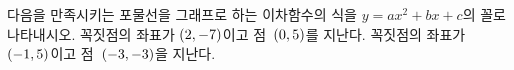 다음을 만족시키는 포물선을 그래프로 하는 이차함수의 식을 $y=ax^2+bx+c$의 꼴로 나타내시오.
 꼭짓점의 좌표가 $(2{,}\mkern3mu\mathopen{}-7)$이고 점~$(0{,}\mkern3mu\mathopen{}5)$를 지난다.
 꼭짓점의 좌표가 $(-1{,}\mkern3mu\mathopen{}5)$이고 점~$(-3{,}\mkern3mu\mathopen{}-3)$을 지난다.
